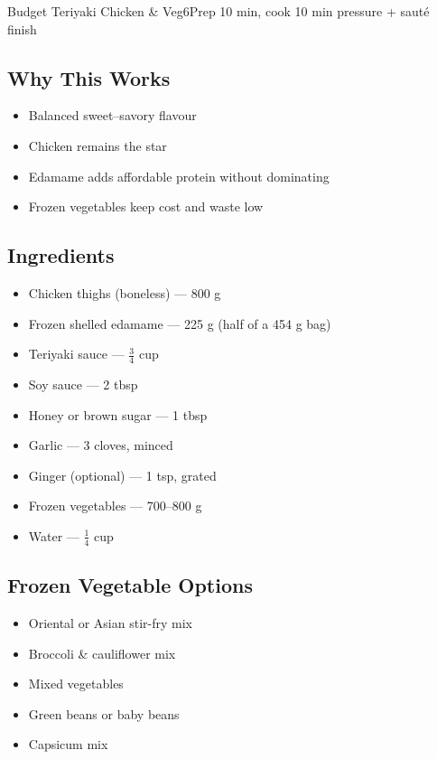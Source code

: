 \begin{recipebox}{Budget Teriyaki Chicken \& Veg}{6}{Prep 10 min, cook 10 min pressure + sauté finish}
\subsection*{Why This Works}
\begin{itemize}
    \item Balanced sweet--savory flavour
    \item Chicken remains the star
    \item Edamame adds affordable protein without dominating
    \item Frozen vegetables keep cost and waste low
\end{itemize}

\subsection*{Ingredients}
\begin{itemize}
    \item Chicken thighs (boneless) — 800 g
    \item Frozen shelled edamame — 225 g (half of a 454 g bag)
    \item Teriyaki sauce — $\tfrac{3}{4}$ cup
    \item Soy sauce — 2 tbsp
    \item Honey or brown sugar — 1 tbsp
    \item Garlic — 3 cloves, minced
    \item Ginger (optional) — 1 tsp, grated
    \item Frozen vegetables — 700--800 g
    \item Water — $\tfrac{1}{4}$ cup
\end{itemize}

\subsection*{Frozen Vegetable Options}
\begin{itemize}
    \item Oriental or Asian stir-fry mix
    \item Broccoli \& cauliflower mix
    \item Mixed vegetables
    \item Green beans or baby beans
    \item Capsicum mix
\end{itemize}


\end{recipebox}
